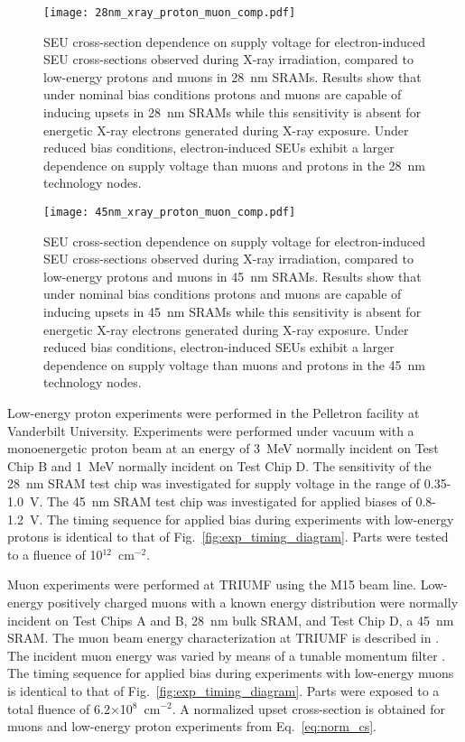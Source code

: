 \begin{figure}[tb]
    \begin{center}
        \texttt{[image: 28nm\_xray\_proton\_muon\_comp.pdf]}
    \end{center}
    \caption{SEU cross-section dependence on supply voltage for electron-induced SEU cross-sections observed during X-ray irradiation, compared to low-energy protons and muons in 28~nm SRAMs. Results show that under nominal bias conditions protons and muons are capable of inducing upsets in 28~nm SRAMs while this sensitivity is absent for energetic X-ray electrons generated during X-ray exposure. Under reduced bias conditions, electron-induced SEUs exhibit a larger dependence on supply voltage than muons and protons in the 28~nm technology nodes.}
    \label{fig:28nm_xray_muon_proton}
\end{figure}
\begin{figure}[tb]
    \begin{center}
        \texttt{[image: 45nm\_xray\_proton\_muon\_comp.pdf]}
    \end{center}
    \caption{SEU cross-section dependence on supply voltage for electron-induced SEU cross-sections observed during X-ray irradiation, compared to low-energy protons and muons in 45~nm SRAMs. Results show that under nominal bias conditions protons and muons are capable of inducing upsets in 45~nm SRAMs while this sensitivity is absent for energetic X-ray electrons generated during X-ray exposure. Under reduced bias conditions, electron-induced SEUs exhibit a larger dependence on supply voltage than muons and protons in the 45~nm technology nodes.}
    \label{fig:45nm_xray_muon_proton}
\end{figure}

Low-energy proton experiments were performed in the Pelletron facility at Vanderbilt University. 
Experiments were performed under vacuum with a monoenergetic proton beam at an energy of 3~MeV normally incident on Test Chip B and 1~MeV normally incident on Test Chip D. 
The sensitivity of the 28~nm SRAM test chip was investigated for supply voltage in the range of 0.35-1.0~V. 
The 45~nm SRAM test chip was investigated for applied biases of 0.8-1.2~V. 
The timing sequence for applied bias during experiments with low-energy protons is identical to that of Fig.~\ref{fig:exp_timing_diagram}. 
Parts were tested to a fluence of 10$^{12}$~cm$^{-2}$.

Muon experiments were performed at TRIUMF using the M15 beam line. 
Low-energy positively charged muons with a known energy distribution were normally incident on Test Chips A and B, 28~nm bulk SRAM, and Test Chip D, a 45~nm SRAM. 
The muon beam energy characterization at TRIUMF is described in \cite{Sierawski:2010cj}. 
The incident muon energy was varied by means of a tunable momentum filter \cite{Sierawski:2010cj, Sierawski:2011bn}. 
The timing sequence for applied bias during experiments with low-energy muons is identical to that of Fig.~\ref{fig:exp_timing_diagram}.
Parts were exposed to a total fluence of 6.2$\times$10$^8$~cm$^{-2}$. A normalized upset cross-section is obtained for muons and low-energy proton experiments from Eq.~\ref{eq:norm_cs}.

